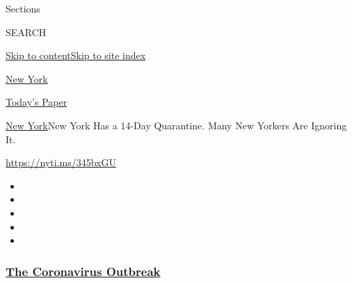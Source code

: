 Sections

SEARCH

\protect\hyperlink{site-content}{Skip to
content}\protect\hyperlink{site-index}{Skip to site index}

\href{https://www.nytimes3xbfgragh.onion/section/nyregion}{New York}

\href{https://myaccount.nytimes3xbfgragh.onion/auth/login?response_type=cookie\&client_id=vi}{}

\href{https://www.nytimes3xbfgragh.onion/section/todayspaper}{Today's
Paper}

\href{/section/nyregion}{New York}\textbar{}New York Has a 14-Day
Quarantine. Many New Yorkers Are Ignoring It.

\url{https://nyti.ms/345bxGU}

\begin{itemize}
\item
\item
\item
\item
\item
\end{itemize}

\hypertarget{the-coronavirus-outbreak}{%
\subsubsection{\texorpdfstring{\href{https://www.nytimes3xbfgragh.onion/news-event/coronavirus?name=styln-coronavirus-national\&region=TOP_BANNER\&block=storyline_menu_recirc\&action=click\&pgtype=Article\&impression_id=2b97f5b0-f1c2-11ea-9164-03af42c480ee\&variant=undefined}{The
Coronavirus
Outbreak}}{The Coronavirus Outbreak}}\label{the-coronavirus-outbreak}}

